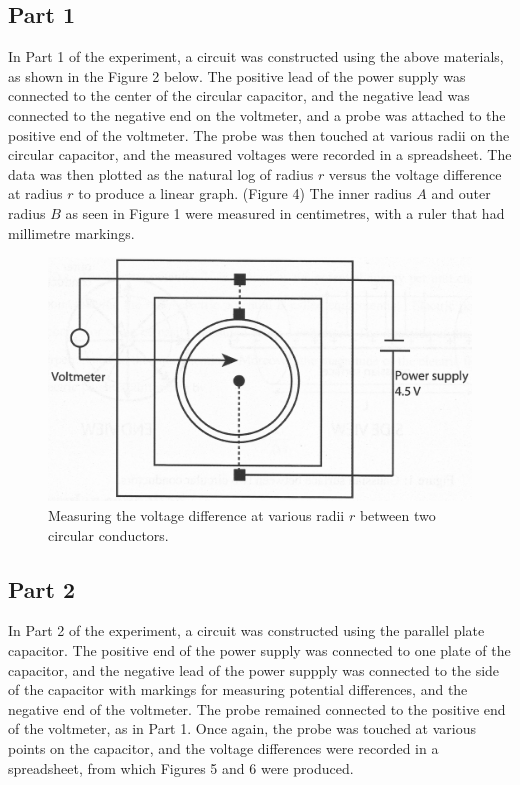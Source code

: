 \documentclass[letterpaper]{article}
\begin{document}
\subsection{Part 1}
In Part 1 of the experiment, a circuit was constructed using the above materials, as shown in the Figure 2 below.
The positive lead of the power supply was connected to the center of the circular capacitor, and the negative lead
was connected to the negative end on the voltmeter, and a probe was attached to the positive end of the voltmeter.
The probe was then touched at various radii on the circular capacitor, and the measured voltages were recorded in
a spreadsheet. The data was then plotted as the natural log of radius $r$ versus the voltage difference at radius $r$
to produce a linear graph. (Figure 4) The inner radius $A$ and outer radius $B$ as seen in Figure 1 were measured in centimetres, with a ruler
that had millimetre markings.
\begin{figure}[H]
    \centering
    \includegraphics[width=.9\textwidth]{fig2.jpg}
    \caption{Measuring the voltage difference at various radii $r$ between two circular conductors. \cite{labmanual}}
\end{figure}


\subsection{Part 2}
In Part 2 of the experiment, a circuit was constructed using the parallel plate capacitor.
The positive end of the power supply was connected to one plate of the capacitor, and the negative
lead of the power suppply was connected to the side of the capacitor with markings for measuring potential
differences, and the negative end of the voltmeter. The probe remained connected to the positive end of the
voltmeter, as in Part 1. Once again, the probe was touched at various points on the capacitor, and the
voltage differences were recorded in a spreadsheet, from which Figures 5 and 6 were produced.
\end{document}

